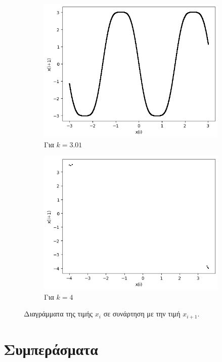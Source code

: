 \begin{figure}[ht]
\begin{subfigure}[b]{0.4\textwidth}
		\includegraphics[width=\textwidth]{LateX images/sine q=-0.5/g20}
		\caption{Για $k=3.01$}
		\label{f:k131}
	\end{subfigure}
	\hfill
	\begin{subfigure}[b]{0.4\textwidth}
		\centering
		\includegraphics[width=\textwidth]{LateX images/sine q=-0.5/g21}
		\caption{Για $k=4$}
		\label{f:k132}
	\end{subfigure}
	\hfill			
	\caption{Διαγράμματα της τιμής \(x_i\) σε συνάρτηση με την τιμή \(x_{i+1}\).}
	\label{f:g58}
\end{figure}

\clearpage

\section{Συμπεράσματα}

